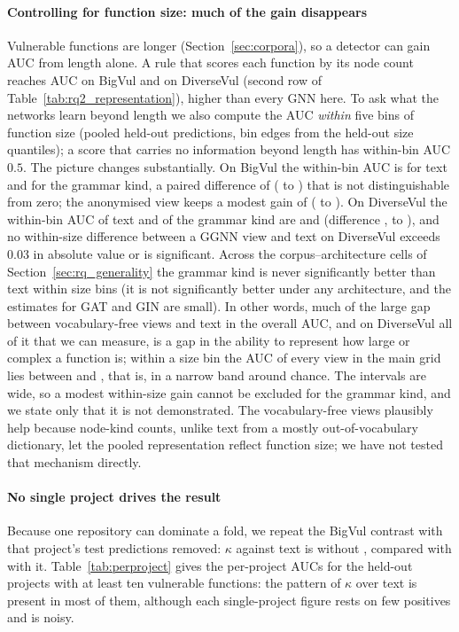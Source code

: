 \paragraph{Controlling for function size: much of the gain disappears}
Vulnerable functions are longer (Section~\ref{sec:corpora}), so a detector can
gain AUC from length alone. A rule that scores each function by its node count
reaches AUC \numbvSizeAuc{} on BigVul and \numdvSizeAuc{} on DiverseVul (second
row of Table~\ref{tab:rq2_representation}), higher than every GNN here. To ask
what the networks learn beyond length we also compute the AUC \emph{within} five
bins of function size (pooled held-out predictions, bin edges from the
held-out size quantiles); a score that carries no information beyond length has
within-bin AUC $0.5$. The picture changes substantially. On BigVul the
within-bin AUC is \mBvGgnnLexSs{} for text and \mBvGgnnKindSs{} for the grammar
kind, a paired difference of \cBvGgnnKindVLexSsD{}
(\cBvGgnnKindVLexSsLo{} to \cBvGgnnKindVLexSsHi{}) that is not distinguishable
from zero; the anonymised view keeps a modest gain of \cBvGgnnAnonVLexSsD{}
(\cBvGgnnAnonVLexSsLo{} to \cBvGgnnAnonVLexSsHi{}). On DiverseVul the within-bin
AUC of text and of the grammar kind are \mDvGgnnLexSs{} and \mDvGgnnKindSs{}
(difference \cDvGgnnKindVLexSsD{}, \cDvGgnnKindVLexSsLo{} to
\cDvGgnnKindVLexSsHi{}), and no within-size difference between a GGNN view and text on DiverseVul
exceeds 0.03 in absolute value or is significant. Across the
corpus--architecture cells of Section~\ref{sec:rq_generality} the grammar kind is
never significantly better than text within size bins (it is not significantly better
under any architecture, and the estimates for GAT and GIN are small). In other words, much of the large gap between
vocabulary-free views and text in the overall AUC, and on DiverseVul all of it
that we can measure, is a gap in the ability to represent how large or complex a
function is;
within a size bin the AUC of every view in the main grid lies between
\numssMin{} and \numssMax{}, that is, in a narrow band around chance. The
intervals are wide, so a modest within-size gain cannot be excluded for the
grammar kind, and we state only that it is not demonstrated.
The vocabulary-free views plausibly help because node-kind counts, unlike text
from a mostly out-of-vocabulary dictionary, let the pooled representation
reflect function size; we have not tested that mechanism directly.

\paragraph{No single project drives the result}
Because one repository can dominate a fold, we repeat the BigVul contrast with
that project's test predictions removed: $\kappa$ against text is
\cBvGgnnKindVLexNoAnd{} without \texttt{\numbigvulTopTestProject}, compared with
\cBvGgnnKindVLexD{} with it. Table~\ref{tab:perproject} gives the per-project
AUCs for the held-out projects with at least ten vulnerable functions:
the pattern of $\kappa$ over text is present in most of them, although each
single-project figure rests on few positives and is noisy.


